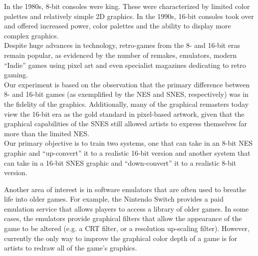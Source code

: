 \documentclass[10pt,twocolumn,letterpaper]{article}
\begin{document}
In the 1980s, 8-bit consoles were king. These were characterized by limited color palettes and relatively simple 2D graphics. In the 1990s, 16-bit consoles took over and offered increased power, color palettes and the ability to display more complex graphics.\\
Despite huge advances in technology, retro-games from the 8- and 16-bit eras remain popular, as evidenced by the number of remakes, emulators, modern ``Indie'' games using pixel art and even specialist magazines dedicating to retro gaming.\\
Our experiment is based on the observation that the primary difference between 8- and 16-bit games (as exemplified by the NES and SNES, respectively) was in the fidelity of the graphics. Additionally, many of the graphical remasters today view the 16-bit era as the gold standard in pixel-based artwork, given that the graphical capabilities of the SNES still allowed artists to express themselves far more than the limited NES.\\
Our primary objective is to train two systems, one that can take in an 8-bit NES graphic and ``up-convert'' it to a realistic 16-bit version and another system that can take in a 16-bit SNES graphic and ``down-convert'' it to a realistic 8-bit version.


Another area of interest is in software emulators that are often used to breathe life into older games. For example, the Nintendo Switch provides a paid emulation service that allows players to access a library of older games. In some cases, the emulators provide graphical filters that allow the appearance of the game to be altered (e.g. a CRT filter, or a resolution up-scaling filter). However, currently the only way to improve the graphical color depth of a game is for artists to redraw all of the game's graphics.

\end{document}
